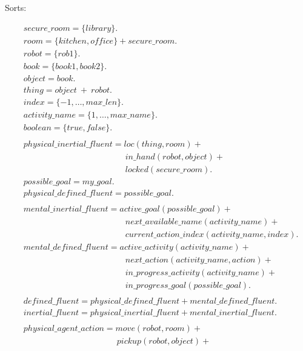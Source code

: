 \documentclass[11pt, oneside]{article}
\begin{document}
Sorts:
\begin{allowdisplaybreaks}
\begin{align*}
  &secure\_room = \{library\}.\\
  &room = \{kitchen, office\} + secure\_room.\\
  &robot = \{rob1\}.\\
  &book = \{book1, book2\}.\\
  &object = book.\\
  &thing = object\ +\ robot.\\
  &index = \{-1,\dots ,max\_len\}.\\
  &activity\_name = \{1, \dots, max\_name\}.\\
  &boolean = \{true, false\}.\\
  \\
  &physical\_inertial\_fluent =  loc(thing, room) +\\
  &\qquad\qquad\qquad\qquad\qquad\qquad in\_hand(robot,object) +\\
  &\qquad\qquad\qquad\qquad\qquad\qquad locked(secure\_room). \\
  &possible\_goal = my\_goal.\\
  &physical\_defined\_fluent = possible\_goal.\\
  \\
  &mental\_inertial\_fluent =  active\_goal(possible\_goal) +\\
&\qquad\qquad\qquad\qquad\qquad\qquad next\_available\_name(activity\_name) +\\
&\qquad\qquad\qquad\qquad\qquad\qquad current\_action\_index(activity\_name, index).\\
&mental\_defined\_fluent = active\_activity(activity\_name)+\\
&\qquad\qquad\qquad\qquad\qquad\qquad next\_action(activity\_name, action)+\\
&\qquad\qquad\qquad\qquad\qquad\qquad in\_progress\_activity(activity\_name)+\\
&\qquad\qquad\qquad\qquad\qquad\qquad in\_progress\_goal(possible\_goal).\\
\\
&defined\_fluent = physical\_defined\_fluent + mental\_defined\_fluent.\\
&inertial\_fluent = physical\_inertial\_fluent + mental\_inertial\_fluent.\\
\\
&physical\_agent\_action =   move(robot, room) +\\
  &\qquad\qquad\qquad\qquad\qquad\quad pickup(robot,object) +\\

\end{align*}
\end{allowdisplaybreaks}
\end{document}
